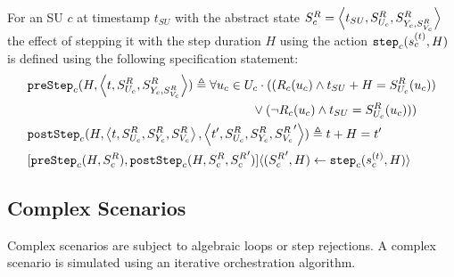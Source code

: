   \begin{definition}\label{def:step}
    For an SU $c$ at timestamp $t_{SU}$ with the abstract state $S^{R}_{c} =  \left\langle t_{SU},S^{R}_{U_{c}}, S^{R}_{Y_{c}, S^{R}_{V_c}} \right\rangle $ the effect of stepping it with the step duration $H$ using the action $\mathtt{step}_{c}(s_{c}^{(t)}, H)$ is defined using the following specification statement:
    \begin{align}
      &\mathtt{preStep}_{c}(H,  \left\langle t,S^{R}_{U_{c}}, S^{R}_{Y_{c}, S^{R}_{V_c}} \right\rangle ) \triangleq 
      \forall u_{c} \in U_{c}
      \cdot 
      ((R_{c}(u_{c}) \land t_{SU} + H = S^{R}_{U_{c}}(u_{c}))
      \nonumber \\
      &\qquad \qquad \qquad \qquad \qquad \qquad \qquad \qquad \qquad 
      \lor 
      (\neg R_{c}(u_{c}) \land t_{SU} = S^{R}_{U_{c}}(u_{c})))
      \nonumber \\
      &\mathtt{postStep}_{c}(H,  \left\langle t,S^{R}_{U_{c}}, S^{R}_{Y_{c}}, S^{R}_{V_c} \right\rangle ,  \left\langle t',S^{R}_{U_{c}}, S^{R}_{Y_{c}}, {S^{R}_{V_c}}' \right\rangle ) \triangleq t + H = t' \nonumber \\
      &[\mathtt{preStep}_{c}(H, S^{R}_{c}), 
      \mathtt{postStep}_{c}(H, S^{R}_{c}, {S^{R}_{c}}')] 
      \langle ({S^{R}_{c}}', H) \gets \mathtt{step}_{c}(s_{c}^{(t)},H) \rangle \nonumber
    \end{align}
  \end{definition}






\subsection{Complex Scenarios}
Complex scenarios are subject to algebraic loops or step rejections.
A complex scenario is simulated using an iterative orchestration algorithm.

